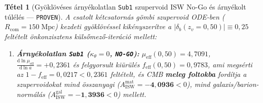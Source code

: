 \documentclass[11pt,a4paper]{article}
\newtheorem{theorem}{Tétel}
\begin{document}
\begin{theorem}[Gyöklövéses árnyékolatlan \textnormal{{\upshape\texttt{Sub1}}} szupervoid ISW No-Go és árnyékolt túlélés --- \textnormal{{\upshape\texttt{PROVEN}}}]
\label{thm:isw-nogo}
A csatolt kétcsatornás gömbi szupervoid ODE-ben ($R_{\mathrm{com}} = 150\;\mathrm{Mpc}$) kezdeti gyöklövéssel kikényszerítve a $|\delta_b(z_v = 0{,}50)| \equiv 0{,}25$ feltételt önkonzisztens külsőmező-iteráció mellett:
\begin{enumerate}
  \item \textbf{Árnyékolatlan {\upshape\texttt{Sub1}} ($\kappa_\theta = 0$, {\upshape\texttt{NO-GO}}):} $\mu_{\mathrm{eff}}(0{,}50) = 4{,}7091$, $\frac{\mathrm{d}\ln\mu_{\mathrm{eff}}}{\mathrm{d}\ln a} = +0{,}2361$ és felgyorsult kiürülés $f_{\mathrm{eff}}(0{,}50) = 0{,}9783$, ami megsérti az $1 - f_{\mathrm{eff}} = 0{,}0217 < 0{,}2361$ feltételt, és CMB \textbf{meleg foltokba} fordítja a szupervoidokat mind összanyagi ($A_{\mathrm{ISW}}^{\mathrm{mat}} = \mathbf{-4{,}0936} < 0$), mind galaxis/barion-normálás ($A_{\mathrm{ISW}}^{\mathrm{gal}} = \mathbf{-1{,}3936} < 0$) mellett.

\end{enumerate}
\end{theorem}
\end{document}

